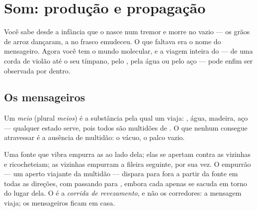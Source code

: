 \chapter{Som: produção e propagação}\label{ch:g7:sound-production}

Você sabe desde a infância que o  nasce num tremor e morre no
vazio --- os grãos de arroz dançaram, a  no frasco emudeceu.
O que faltava era o nome do mensageiro. Agora você tem o mundo
molecular, e a viagem inteira do  --- de uma corda de violão até o
seu tímpano, pelo , pela água ou pelo aço --- pode enfim ser
observada por dentro.

\section{Os mensageiros}

\begin{definition}[Meio]\label{def:g7:sound-production:medium}
Um \emph{meio} (plural \emph{meios}) é a substância pela
qual um  viaja: , água, madeira, aço --- qualquer estado serve,
pois todos são multidões de . O que  nenhum consegue
atravessar é a ausência de multidão: o vácuo, o palco vazio.
\end{definition}

\begin{proposition}\label{prop:g7:sound-production:travel}
Uma fonte que vibra empurra as  ao lado dela; elas se
apertam contra as vizinhas e ricocheteiam; as vizinhas empurram a
fileira seguinte, por sua vez. O empurrão --- um aperto viajante da
multidão --- dispara para fora a partir da fonte em todas as
direções, com  passando para , embora cada 
apenas se sacuda em torno do lugar dela. O  é a \emph{corrida de
revezamento}, e não os corredores: a mensagem viaja; os mensageiros
ficam em casa.
\end{proposition}

